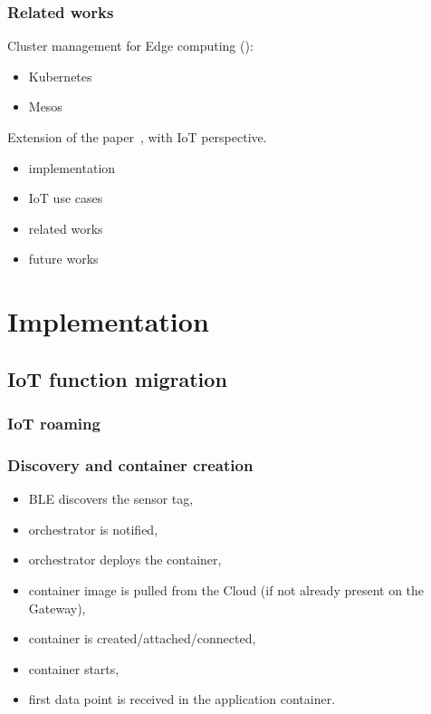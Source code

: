 \documentclass{beamer}
\begin{document}
\begin{frame}
\frametitle{Related works}

Cluster management for Edge computing (\cite{pahl2015}):
  \begin{itemize}
    \item Kubernetes
    \item Mesos
  \end{itemize}

Extension of the paper~\cite{pizzolli2016}, with IoT perspective.
  \begin{itemize}
    \item implementation
    \item IoT use cases
    \item related works
    \item future works
  \end{itemize}

\end{frame}



\section{Implementation}

\subsection{IoT function migration}

\begin{frame}
\frametitle{IoT roaming}
 
\end{frame}



\begin{frame}
\frametitle{Discovery and container creation}

  \begin{itemize}
  \item BLE discovers the sensor tag,
  \item orchestrator is notified,
  \item orchestrator deploys the container,
  \item container image is pulled from the Cloud (if not already present on the Gateway),
  \item container is created/attached/connected,
  \item container starts,
  \item first data point is received in the application container.
  \end{itemize}
    
\end{frame}
\end{document}
